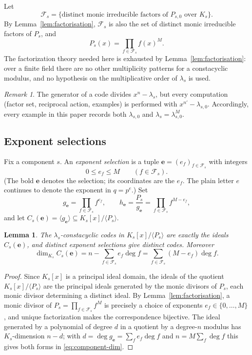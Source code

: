 \documentclass[preprint,12pt,a4paper]{elsarticle}
\newcommand{\Fs}{\mathcal F_s}
\newtheorem{lemma}[theorem]{Lemma}
\theoremstyle{definition}
\theoremstyle{remark}
\newtheorem{remark}[theorem]{Remark}
\begin{document}
Let
\[
\Fs=\{\text{distinct monic irreducible factors of }P_{s,0}\text{ over }K_s\}.
\]
By Lemma~\ref{lem:factorisation}, $\Fs$ is also the set of distinct monic
irreducible factors of $P_s$, and
\[
P_s(x)=\prod_{f\in\Fs}f(x)^M .
\]
The factorization theory needed here is exhausted by
Lemma~\ref{lem:factorisation}: over a finite field there are no other
multiplicity patterns for a constacyclic modulus, and no hypothesis on the
multiplicative order of $\lambda_s$ is used.

\begin{remark}\label{rem:lambda0}
The generator of a code divides $x^n-\lambda_s$, but every computation (factor
set, reciprocal action, examples) is performed with $x^{n'}-\lambda_{s,0}$.
Accordingly, every example in this paper records both $\lambda_{s,0}$ and
$\lambda_s=\lambda_{s,0}^M$.
\end{remark}

\subsection{Exponent selections}\label{sec:selections}

Fix a component $s$.  An \emph{exponent selection} is a tuple
$\mathbf{e}=(e_f)_{f\in\Fs}$ with integers
\[
0\leq e_f\leq M\qquad(f\in\Fs).
\]
(The bold $\mathbf{e}$ denotes the selection; its coordinates are the $e_f$.
The plain letter $e$ continues to denote the exponent in $q=p^e$.)  Set
\[
g_{\mathbf{e}}=\prod_{f\in\Fs}f^{e_f},
\qquad
h_{\mathbf{e}}=\frac{P_s}{g_{\mathbf{e}}}
   =\prod_{f\in\Fs}f^{M-e_f},
\]
and let $C_s(\mathbf{e})=\langle g_{\mathbf{e}}\rangle\subseteq
K_s[x]/\langle P_s\rangle$.

\begin{lemma}\label{lem:component-selection}
The $\lambda_s$-constacyclic codes in $K_s[x]/\langle P_s\rangle$ are exactly
the ideals $C_s(\mathbf{e})$, and distinct exponent selections give distinct
codes.  Moreover
\begin{equation}\label{eq:component-dim}
\dim_{K_s}C_s(\mathbf{e})
   =n-\sum_{f\in\Fs}e_f\deg f
   =\sum_{f\in\Fs}(M-e_f)\deg f .
\end{equation}
\end{lemma}

\begin{proof}
Since $K_s[x]$ is a principal ideal domain, the ideals of the quotient
$K_s[x]/\langle P_s\rangle$ are the principal ideals generated by the monic
divisors of $P_s$, each monic divisor determining a distinct ideal.  By
Lemma~\ref{lem:factorisation}, a monic divisor of
$P_s=\prod_{f\in\Fs}f^M$ is precisely a choice of exponents
$e_f\in\{0,\ldots,M\}$, and unique factorization makes the correspondence
bijective.  The ideal generated by a polynomial of degree $d$ in a quotient by a
degree-$n$ modulus has $K_s$-dimension $n-d$; with
$d=\deg g_{\mathbf{e}}=\sum_f e_f\deg f$ and $n=M\sum_f\deg f$ this gives both
forms in \eqref{eq:component-dim}.
\end{proof}
\end{document}
